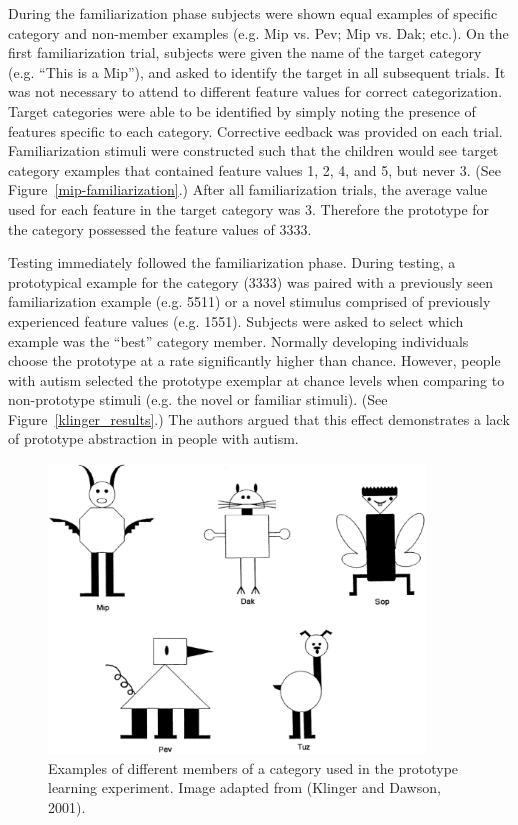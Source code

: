 During the familiarization phase subjects were shown equal examples of specific category and non-member examples (e.g. Mip vs. Pev;  Mip vs. Dak; etc.).  On the first familiarization trial, subjects were given the name of the target category (e.g. ``This is a Mip''), and asked to identify the target in all subsequent trials.  It was not necessary to attend to different feature values for correct categorization.  Target categories were able to be identified by simply noting the presence of features specific to each category. Corrective eedback was provided on each trial. Familiarization stimuli were constructed such that the children would see target category examples that contained feature values 1, 2, 4, and 5, but never 3. (See Figure~\ref{mip-familiarization}.)  After all familiarization trials, the average value used for each feature in the target category was 3. Therefore the prototype for the category possessed the feature values of 3333.  

Testing immediately followed the familiarization phase.  During testing, a prototypical example for the category (3333) was paired with a previously seen familiarization example (e.g. 5511) or a novel stimulus comprised of previously experienced feature values (e.g. 1551).  Subjects were asked to select which example was the ``best'' category member.  Normally developing individuals choose the prototype at a rate significantly higher than chance.  However, people with autism selected the prototype exemplar at chance levels when comparing to non-prototype stimuli (e.g. the novel or familiar stimuli). (See Figure~\ref{klinger_results}.)  The authors argued that this effect demonstrates a lack of prototype abstraction in people with autism.  

\begin{figure}[ht]
\begin{center}
	\includegraphics[width=100mm]{figures/prototype_categories.eps}
\end{center}
\caption{Examples of different members of a category used in the prototype learning experiment.  Image adapted from (Klinger and Dawson, 2001).}
\label{prototype-categories}
\end{figure} 

